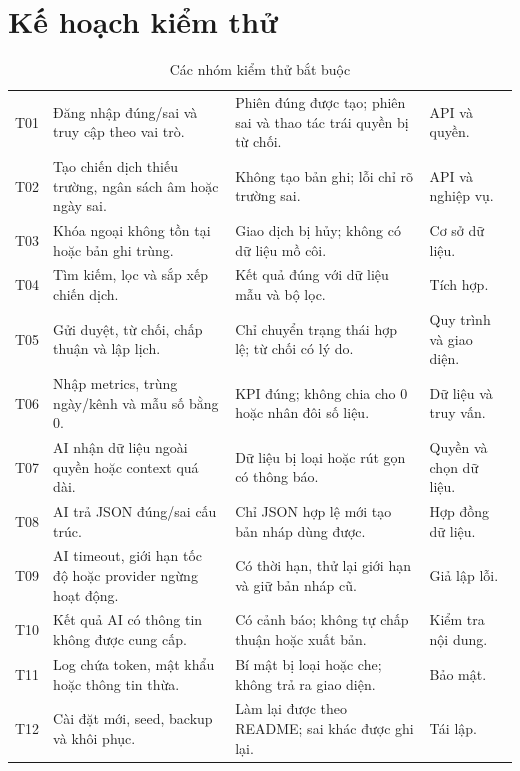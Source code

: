 \clearpage
\section{Kế hoạch kiểm thử}

\begin{table}[!htbp]
\centering
\small
\caption{Các nhóm kiểm thử bắt buộc}
\label{tab:v8-test-plan}
\renewcommand{\arraystretch}{1.03}
\begin{tabularx}{\textwidth}{|C{1.0cm}|L{3.6cm}|Y|L{2.6cm}|}
\hline
{} &  &  & \\
\hline
T01 & Đăng nhập đúng/sai và truy cập theo vai trò. & Phiên đúng được tạo; phiên sai và thao tác trái quyền bị từ chối. & API và quyền.\\
\hline
T02 & Tạo chiến dịch thiếu trường, ngân sách âm hoặc ngày sai. & Không tạo bản ghi; lỗi chỉ rõ trường sai. & API và nghiệp vụ.\\
\hline
T03 & Khóa ngoại không tồn tại hoặc bản ghi trùng. & Giao dịch bị hủy; không có dữ liệu mồ côi. & Cơ sở dữ liệu.\\
\hline
T04 & Tìm kiếm, lọc và sắp xếp chiến dịch. & Kết quả đúng với dữ liệu mẫu và bộ lọc. & Tích hợp.\\
\hline
T05 & Gửi duyệt, từ chối, chấp thuận và lập lịch. & Chỉ chuyển trạng thái hợp lệ; từ chối có lý do. & Quy trình và giao diện.\\
\hline
T06 & Nhập metrics, trùng ngày/kênh và mẫu số bằng 0. & KPI đúng; không chia cho 0 hoặc nhân đôi số liệu. & Dữ liệu và truy vấn.\\
\hline
T07 & AI nhận dữ liệu ngoài quyền hoặc context quá dài. & Dữ liệu bị loại hoặc rút gọn có thông báo. & Quyền và chọn dữ liệu.\\
\hline
T08 & AI trả JSON đúng/sai cấu trúc. & Chỉ JSON hợp lệ mới tạo bản nháp dùng được. & Hợp đồng dữ liệu.\\
\hline
T09 & AI timeout, giới hạn tốc độ hoặc provider ngừng hoạt động. & Có thời hạn, thử lại giới hạn và giữ bản nháp cũ. & Giả lập lỗi.\\
\hline
T10 & Kết quả AI có thông tin không được cung cấp. & Có cảnh báo; không tự chấp thuận hoặc xuất bản. & Kiểm tra nội dung.\\
\hline
T11 & Log chứa token, mật khẩu hoặc thông tin thừa. & Bí mật bị loại hoặc che; không trả ra giao diện. & Bảo mật.\\
\hline
T12 & Cài đặt mới, seed, backup và khôi phục. & Làm lại được theo README; sai khác được ghi lại. & Tái lập.\\

\end{tabularx}
\end{table}
